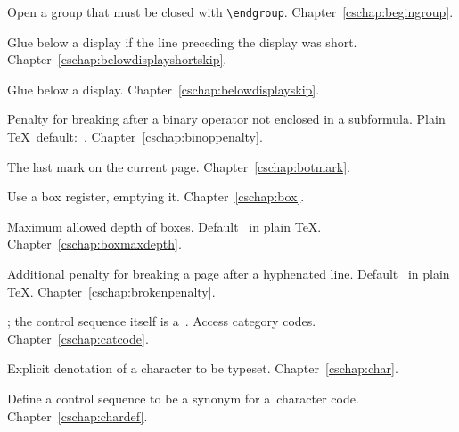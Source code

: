 \begin{glossinventory}
\item [\cs{begingroup}]
      Open a group that must be closed with \verb-\endgroup-.
Chapter~\ref{cschap:begingroup}.

\item [\cs{belowdisplayshortskip}]
      Glue below a display if the line preceding the display was short.
Chapter~\ref{cschap:belowdisplayshortskip}.

\item [\cs{belowdisplayskip}]
      Glue below a display.
Chapter~\ref{cschap:belowdisplayskip}.

\item [\cs{binoppenalty}]
      Penalty for breaking after a binary operator not enclosed in
      a subformula.
      Plain \TeX\ default:~.
Chapter~\ref{cschap:binoppenalty}.

\item [\cs{botmark}]
      The last mark on the current page.
Chapter~\ref{cschap:botmark}.

\item [\cs{box\gr{8-bit number}}]
      Use a box register, emptying it. 
Chapter~\ref{cschap:box}.

\item [\cs{boxmaxdepth}]
      Maximum allowed depth of boxes.
      Default~ in plain \TeX.
Chapter~\ref{cschap:boxmaxdepth}.

\item [\cs{brokenpenalty}]
      Additional penalty for breaking a page after a hyphenated line. 
      Default~ in plain \TeX.
Chapter~\ref{cschap:brokenpenalty}.

\item [\cs{catcode\gr{8-bit number}}]
      ; the control sequence itself
      is a~.
      Access category codes.
Chapter~\ref{cschap:catcode}.

\item [\cs{char\gr{number}}]
      Explicit denotation of a character to be typeset. 
Chapter~\ref{cschap:char}.

\item [\cs{chardef\gr{control sequence}\gr{equals}\gr{number}}]
      Define a control sequence to be a synonym for
      a~character code.
Chapter~\ref{cschap:chardef}.


\end{glossinventory}
